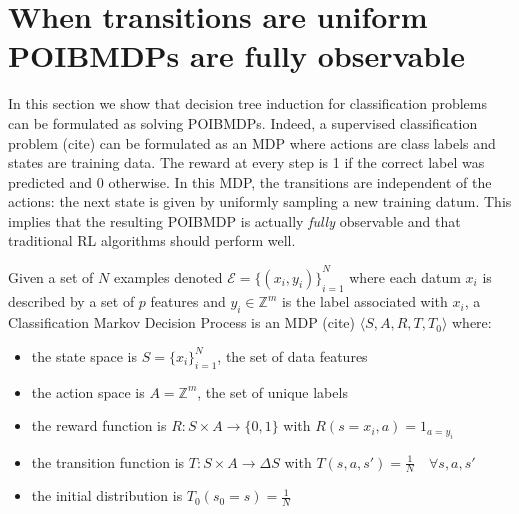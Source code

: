 \chapter{When transitions are uniform POIBMDPs are fully observable}
In this section we show that decision tree induction for classification problems can be formulated as solving POIBMDPs.
Indeed, a supervised classification problem (cite) can be formulated as an MDP where actions are class labels and states are training data.
The reward at every step is 1 if the correct label was predicted and 0 otherwise.
In this MDP, the transitions are independent of the actions: the next state is given by uniformly sampling a new training datum. 
This implies that the resulting POIBMDP is actually \textit{fully} observable and that traditional RL algorithms should perform well.

\begin{definition}
    Given a set of $N$ examples denoted $\mathcal{E} = {\{(x_i, y_i)\}}_{i=1}^N$ where each datum $x_i$ is described by a set of $p$ features and $y_i \in \mathbb{Z}^m$ is the label associated with $x_i$, a Classification Markov Decision Process is an MDP (cite) $\langle S, A, R, T, T_0 \rangle$ where:
    \begin{itemize}
        \item the state space is $S={\{x_i\}}_{i=1}^N$, the set of data features
        \item the action space is $A=\mathbb{Z}^m$, the set of unique labels
        \item the reward function is $R:S\times A \rightarrow \{0, 1\}$ with $R(s=x_i, a) = 1_{a=y_i}$
        \item the transition function is $T:S\times A \rightarrow \Delta S$ with $T(s, a, s') = \frac{1}{N} \quad \forall s, a, s'$
        \item the initial distribution is $T_0(s_0 = s) = \frac{1}{N}$
    \end{itemize}
\end{definition}

